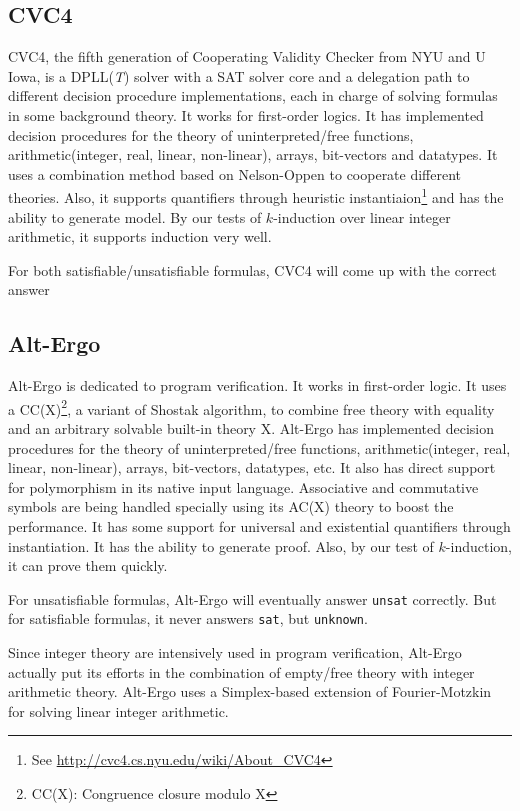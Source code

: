 \documentclass[10pt,twocolumn,letter]{article}
\theoremstyle{definition}
\begin{document}
\subsection{CVC4}

CVC4, the fifth generation of Cooperating Validity Checker from NYU and U Iowa, is a DPLL({\it T}) solver with a SAT solver core and a delegation path to different decision procedure implementations, each in charge of solving formulas in some background theory\cite{barrett:cvc4:2011}. It works for first-order logics. It has implemented decision procedures for the theory of uninterpreted/free functions, arithmetic(integer, real, linear, non-linear), arrays, bit-vectors and datatypes. It uses a combination method based on Nelson-Oppen to cooperate different theories. Also, it supports quantifiers through heuristic instantiaion\footnote{See \url{http://cvc4.cs.nyu.edu/wiki/About_CVC4}} and has the ability to generate model. By our tests of $k$-induction over linear integer arithmetic, it supports induction very well.

For both satisfiable/unsatisfiable formulas, CVC4 will come up with the correct answer

\subsection{Alt-Ergo}

Alt-Ergo is dedicated to program verification. It works in first-order logic. It uses a CC(X)\footnote{CC(X): Congruence closure modulo X}, a variant of Shostak algorithm, to combine free theory with equality and an arbitrary solvable built-in theory X\cite{conchonHDR2012}. Alt-Ergo has implemented decision procedures for the theory of uninterpreted/free functions, arithmetic(integer, real, linear, non-linear), arrays, bit-vectors, datatypes, etc. It also has direct support for polymorphism in its native input language. Associative and commutative symbols are being handled specially using its AC(X) theory to boost the performance. It has some support for universal and existential quantifiers through instantiation. It has the ability to generate proof. Also, by our test of $k$-induction, it can prove them quickly.

For unsatisfiable formulas, Alt-Ergo will eventually answer {\tt unsat} correctly. But for satisfiable formulas, it never answers {\tt sat}, but {\tt unknown}.

Since integer theory are intensively used in program verification, Alt-Ergo actually put its efforts in the combination of empty/free theory with integer arithmetic theory. Alt-Ergo uses a Simplex-based extension of Fourier-Motzkin for solving linear integer arithmetic\cite{bobot:hal-00687640}.
\end{document}
